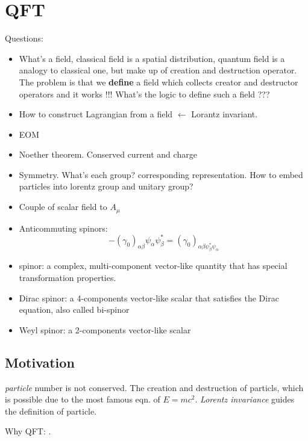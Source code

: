 \chapter{QFT}

Questions:
\begin{itemize}
    \item What's a field, classical field is a spatial distribution, quantum
	field is a analogy to classical one, but make up of creation and
	destruction operator. The problem is that we \textbf{define} a field which
	collects creator and destructor operators and it works !!! What's
	the logic to define such a field ???
    \item How to construct Lagrangian from a field $\leftarrow$ Lorantz
	invariant.
    \item EOM
    \item Noether theorem. Conserved current and charge
    \item Symmetry. What's each group? corresponding representation. How to
	embed particles into lorentz group and unitary group?
    \item Couple of scalar field to $A_\mu$
    \item Anticommuting spinors:
	\[  -(\gamma_0)_{\alpha\beta}\psi_\alpha\psi^*_\beta=(\gamma_0)_{\alpha\beta\psi^*_\beta\psi_\alpha}	\]
\end{itemize}

\begin{itemize}
    \item spinor: a complex, multi-component vector-like quantity that has
	special transformation properties.
    \item Dirac spinor: a 4-components vector-like scalar that satisfies 
	the Dirac equation, also called bi-spinor
    \item Weyl spinor: a 2-components vector-like scalar
\end{itemize}

\section{Motivation}

\emph{particle} number is not conserved. The creation and destruction of
particls, which is possible due to the most famous eqn. of \sr{} $E =
mc^{2}$. \emph{Lorentz invariance} guides the definition of particle.

Why QFT: . \\

